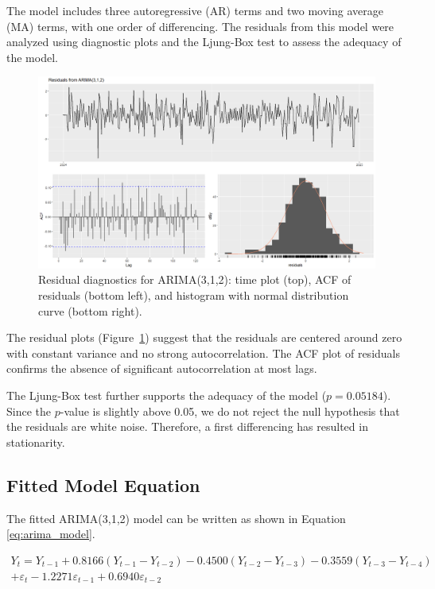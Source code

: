\documentclass{article}
\begin{document}
The model includes three autoregressive (AR) terms and two moving average (MA) terms, with one order of differencing. The residuals from this model were analyzed using diagnostic plots and the Ljung-Box test to assess the adequacy of the model.

\begin{figure}
  \includegraphics[width=\textwidth]{finalproject/images/arima-residuals.png}
  \caption{Residual diagnostics for ARIMA(3,1,2): time plot (top), ACF of residuals (bottom left), and histogram with normal distribution curve (bottom right).}
  \label{fig:arima_residuals}
\end{figure}

The residual plots (Figure~\ref{fig:arima_residuals}) suggest that the residuals are centered around zero with constant variance and no strong autocorrelation. The ACF plot of residuals confirms the absence of significant autocorrelation at most lags.

The Ljung-Box test further supports the adequacy of the model ($p = 0.05184$). Since the $p$-value is slightly above 0.05, we do not reject the null hypothesis that the residuals are white noise. Therefore, a first differencing has resulted in stationarity.

\subsection{Fitted Model Equation}

The fitted ARIMA(3,1,2) model can be written as shown in Equation \ref{eq:arima_model}.

\begin{multline}
\label{eq:arima_model}
Y_t = Y_{t-1} 
+ 0.8166 (Y_{t-1} - Y_{t-2}) 
- 0.4500 (Y_{t-2} - Y_{t-3}) 
- 0.3559 (Y_{t-3} - Y_{t-4}) \\
+ \varepsilon_t 
- 1.2271 \varepsilon_{t-1} 
+ 0.6940 \varepsilon_{t-2}
\end{multline}
\end{document}
